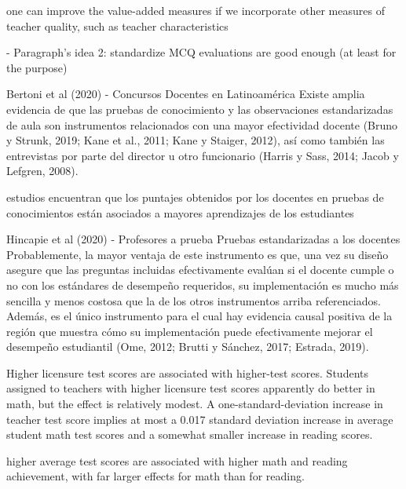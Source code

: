 one can improve the value-added measures if we incorporate other measures of teacher quality, such as teacher characteristics \citep{Chetty_et_al_2014a}



- Paragraph's idea 2: standardize MCQ evaluations are good enough (at least for the purpose)

Bertoni et al (2020) - Concursos Docentes en Latinoamérica
Existe amplia evidencia de que las pruebas de conocimiento y las observaciones estandarizadas de aula son instrumentos relacionados con una mayor efectividad docente (Bruno y Strunk, 2019; Kane et al., 2011; Kane y Staiger, 2012), así como también las entrevistas por parte del director u otro funcionario (Harris y Sass, 2014; Jacob y Lefgren, 2008).

estudios encuentran que los puntajes obtenidos por los docentes en pruebas de conocimientos están asociados a mayores aprendizajes de los estudiantes \citep{Bietenbeck_et_al_2018; Clotfelter_et_al_2006; Clotfelter_et_al_2007}


Hincapie et al (2020) - Profesores a prueba
Pruebas estandarizadas a los docentes
Probablemente, la mayor ventaja de este instrumento es que, una vez su diseño asegure que las preguntas incluidas efectivamente evalúan si el docente cumple o no con los estándares de desempeño requeridos, su implementación es mucho más sencilla y menos costosa que la de los otros instrumentos arriba referenciados. Además, es el único instrumento para el cual hay evidencia causal positiva de la región que muestra cómo su implementación puede efectivamente mejorar el desempeño estudiantil (Ome, 2012; Brutti y Sánchez, 2017; Estrada, 2019).


Higher licensure test scores are associated with higher-test scores. Students assigned to teachers with higher licensure test scores apparently do better in math, but the effect is relatively modest. A one-standard-deviation increase in teacher test score implies at most a 0.017 standard deviation increase in average student math test scores and a somewhat smaller increase in reading scores. \citep{Clotfelter_et_al_2006}

higher average test scores are associated with higher math and reading achievement, with far larger effects for math than for reading. \citep{Clotfelter_et_al_2007}

